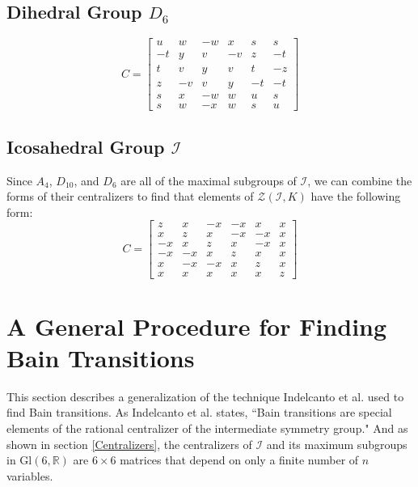 \documentclass[a4paper,10pt]{article}
\theoremstyle{plain}
\theoremstyle{definition}
\theoremstyle{remark}
\newcommand{\R}{\mathbb{R}}
\newcommand\Gl{\text{Gl}}
\begin{document}
\subsection{Dihedral Group \(D_{6}\)}
\[C = \begin{bmatrix}
    u  & w  & -w & x  & s  & s  \\
    -t & y  & v  & -v & z  & -t \\
    t  & v  & y  & v  & t  & -z \\
    z  & -v & v  & y  & -t & -t \\
    s  & x  & -w & w  & u  & s  \\
    s  & w  & -x & w  & s  & u 
\end{bmatrix}\]

\subsection{Icosahedral Group \(\mathcal{I}\)}
Since \(A_4\), \(D_{10}\), and \(D_6\) are all of the maximal subgroups of \(\mathcal{I}\), we can combine the forms of their centralizers to find that elements of \(\mathcal{Z}(\mathcal{I}, K)\) have the following form:
\[C = \begin{bmatrix}
    z  & x  & -x & -x & x  & x \\
    x  & z  & x  & -x & -x & x \\
    -x & x  & z  & x  & -x & x \\
    -x & -x & x  & z  & x  & x \\
    x  & -x & -x & x  & z  & x \\
    x  & x  & x  & x  & x  & z
\end{bmatrix}\]

\section{A General Procedure for Finding Bain Transitions} \label{A General Procedure for Finding Bain Transitions}
This section describes a generalization of the technique Indelcanto et al. \cite{indelicatoetal2012} used to find Bain transitions.
As Indelcanto et al. \cite{indelicatoetal2012} states, ``Bain transitions are special elements of the rational centralizer of the intermediate symmetry group."
And as shown in section \ref{Centralizers}, the centralizers of \(\mathcal{I}\) and its maximum subgroups in \(\Gl(6, \R)\) are \(6 \times 6\) matrices that depend on only a finite number of \(n\) variables.
\end{document}
